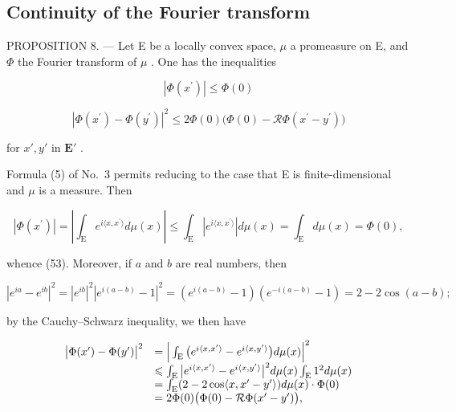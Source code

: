 \subsection{Continuity of the Fourier transform}

PROPOSITION 8. --- Let E be a locally convex space, \(\mu\) a promeasure on E, and \(\Phi\) the Fourier transform of \(\mu\) . One has the inequalities

\[
\left| \Phi (x ^ {\prime}) \right| \leqslant \Phi (0)\tag{53}
\]

\[
\left| \Phi (x ^ {\prime}) - \Phi (y ^ {\prime}) \right| ^ {2} \leqslant 2 \Phi (0) \big (\Phi (0) - \mathcal {R} \Phi (x ^ {\prime} - y ^ {\prime}) \big)\tag{54}
\]

for \(x', y'\) in \(\mathbf{E}'\) .

Formula (5) of No.~3 permits reducing to the case that E is finite-dimensional and \(\mu\) is a measure. Then

\[
\left| \Phi (x ^ {\prime}) \right| = \left| \int_ {\mathrm{E}} e ^ {i \langle x, x ^ {\prime} \rangle} d \mu (x) \right| \leqslant \int_ {\mathrm{E}} | e ^ {i \langle x, x ^ {\prime} \rangle} | d \mu (x) = \int_ {\mathrm{E}} d \mu (x) = \Phi (0),
\]

whence (53). Moreover, if \(a\) and \(b\) are real numbers, then

\[
\left| e ^ {i a} - e ^ {i b} \right| ^ {2} = \left| e ^ {i b} \right| ^ {2} \left| e ^ {i (a - b)} - 1 \right| ^ {2} = \left(e ^ {i (a - b)} - 1\right) \left(e ^ {- i (a - b)} - 1\right) = 2 - 2 \cos (a - b);
\]

by the Cauchy--Schwarz inequality, we then have

\[
\begin{array}{r l} \big | \Phi (x ^ {\prime}) - \Phi (y ^ {\prime}) \big | ^ {2} & = \Big | \int_ {\mathrm{E}} \big (e ^ {i \langle x, x ^ {\prime} \rangle} - e ^ {i \langle x, y ^ {\prime} \rangle} \big) d \mu (x) \Big | ^ {2} \\ & \leqslant \int_ {\mathrm{E}} \big | e ^ {i \langle x, x ^ {\prime} \rangle} - e ^ {i \langle x, y ^ {\prime} \rangle} \big | ^ {2} d \mu (x) \int_ {\mathrm{E}} 1 ^ {2} d \mu (x) \\ & = \int_ {\mathrm{E}} (2 - 2 \cos \langle x, x ^ {\prime} - y ^ {\prime} \rangle) d \mu (x) \cdot \Phi (0) \\ & = 2 \Phi (0) \big (\Phi (0) - \mathcal {R} \Phi (x ^ {\prime} - y ^ {\prime}) \big), \end{array}
\]

